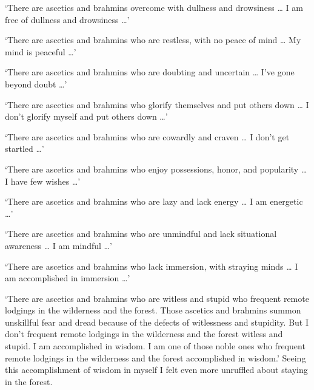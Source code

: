 \documentclass[12pt,openany]{book}%
\begin{document}
‘There are ascetics and brahmins overcome with dullness and drowsiness … I am free of dullness and drowsiness …’ 

‘There are ascetics and brahmins who are restless, with no peace of mind … My mind is peaceful …’ 

‘There are ascetics and brahmins who are doubting and uncertain … I’ve gone beyond doubt …’ 

‘There are ascetics and brahmins who glorify themselves and put others down … I don’t glorify myself and put others down …’ 

‘There are ascetics and brahmins who are cowardly and craven … I don’t get startled …’ 

‘There are ascetics and brahmins who enjoy possessions, honor, and popularity … I have few wishes …’ 

‘There are ascetics and brahmins who are lazy and lack energy … I am energetic …’ 

‘There are ascetics and brahmins who are unmindful and lack situational awareness … I am mindful …’ 

‘There are ascetics and brahmins who lack immersion, with straying minds … I am accomplished in immersion …’ 

‘There are ascetics and brahmins who are witless and stupid who frequent remote lodgings in the wilderness and the forest. Those ascetics and brahmins summon unskillful fear and dread because of the defects of witlessness and stupidity. But I don’t frequent remote lodgings in the wilderness and the forest witless and stupid. I am accomplished in wisdom. I am one of those noble ones who frequent remote lodgings in the wilderness and the forest accomplished in wisdom.’ Seeing this accomplishment of wisdom in myself I felt even more unruffled about staying in the forest. 
\end{document}
